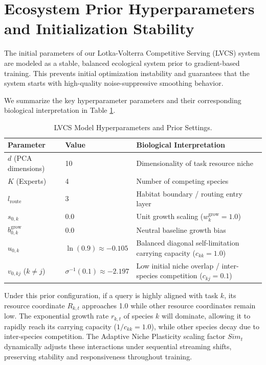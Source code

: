 \documentclass{article}
\theoremstyle{plain}
\theoremstyle{definition}
\theoremstyle{remark}
\begin{document}
\section{Ecosystem Prior Hyperparameters and Initialization Stability}
\label{app:initialization}

The initial parameters of our Lotka-Volterra Competitive Serving (LVCS) system are modeled as a stable, balanced ecological system prior to gradient-based training. This prevents initial optimization instability and guarantees that the system starts with high-quality noise-suppressive smoothing behavior.

We summarize the key hyperparameter parameters and their corresponding biological interpretation in Table \ref{tab:hyperparams}.

\begin{table}[h]
\caption{LVCS Model Hyperparameters and Prior Settings.}
\label{tab:hyperparams}
\vskip 0.15in
\begin{center}
\begin{small}
\begin{sc}
\begin{tabular}{lll}
\toprule
Parameter & Value & Biological Interpretation \\
\midrule
$d$ (PCA dimensions) & 10 & Dimensionality of task resource niche \\
$K$ (Experts) & 4 & Number of competing species \\
$l_{\text{route}}$ & 3 & Habitat boundary / routing entry layer \\
$s_{0, k}$ & 0.0 & Unit growth scaling ($w_k^{\text{grow}} = 1.0$) \\
$b_{0, k}^{\text{grow}}$ & 0.0 & Neutral baseline growth bias \\
$u_{0, k}$ & $\ln(0.9) \approx -0.105$ & Balanced diagonal self-limitation carrying capacity ($c_{kk} = 1.0$) \\
$v_{0, kj}$ ($k \neq j$) & $\sigma^{-1}(0.1) \approx -2.197$ & Low initial niche overlap / inter-species competition ($c_{kj} = 0.1$) \\
\bottomrule
\end{tabular}
\end{sc}
\end{small}
\end{center}
\vskip -0.1in
\end{table}

Under this prior configuration, if a query is highly aligned with task $k$, its resource coordinate $R_{k, t}$ approaches 1.0 while other resource coordinates remain low. The exponential growth rate $r_{k, t}$ of species $k$ will dominate, allowing it to rapidly reach its carrying capacity ($1/c_{kk} = 1.0$), while other species decay due to inter-species competition. The Adaptive Niche Plasticity scaling factor $Sim_t$ dynamically adjusts these interactions under sequential streaming shifts, preserving stability and responsiveness throughout training.

\end{document}
